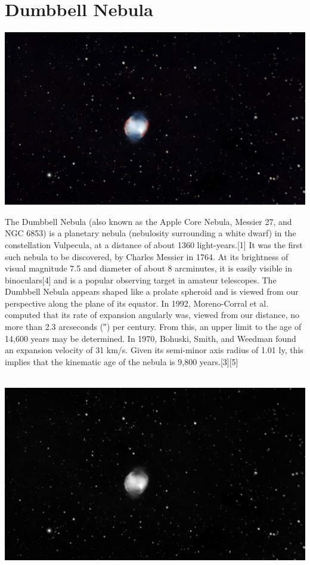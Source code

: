 \ \\\section{Dumbbell Nebula}
\includegraphics[width=\textwidth]{../Imaging//Original/Dumbbell_Nebula.jpg}
{\footnotesize\color{white}
The Dumbbell Nebula (also known as the Apple Core Nebula, Messier 27, and NGC 6853) is a planetary nebula (nebulosity surrounding a white dwarf) in the constellation Vulpecula, at a distance of about 1360 light-years.[1] It was the first such nebula to be discovered, by Charles Messier in 1764. At its brightness of visual magnitude 7.5 and diameter of about 8 arcminutes, it is easily visible in binoculars[4] and is a popular observing target in amateur telescopes. The Dumbbell Nebula appears shaped like a prolate spheroid and is viewed from our perspective along the plane of its equator. In 1992, Moreno-Corral et al. computed that its rate of expansion angularly was, viewed from our distance, no more than 2.3 arcseconds (″) per century. From this, an upper limit to the age of 14,600 years may be determined. In 1970, Bohuski, Smith, and Weedman found an expansion velocity of 31 km/s. Given its semi-minor axis radius of 1.01 ly, this implies that the kinematic age of the nebula is 9,800 years.[3][5]


}\ \\
\includegraphics[width=\textwidth]{../Imaging//Grayscale/Dumbbell_Nebula.jpg}
